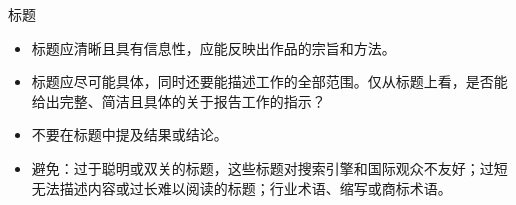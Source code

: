 标题

\begin{itemize}
\item 标题应清晰且具有信息性，应能反映出作品的宗旨和方法。
\item 标题应尽可能具体，同时还要能描述工作的全部范围。仅从标题上看，是否能给出完整、简洁且具体的关于报告工作的指示？
\item 不要在标题中提及结果或结论。
\item 避免：过于聪明或双关的标题，这些标题对搜索引擎和国际观众不友好；过短无法描述内容或过长难以阅读的标题；行业术语、缩写或商标术语。
\end{itemize}